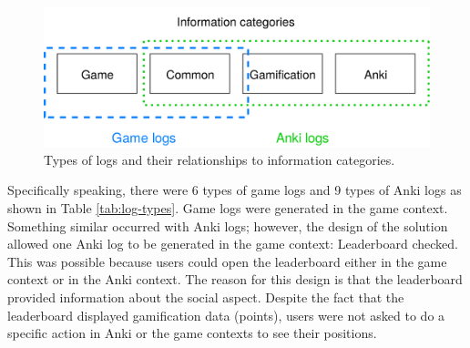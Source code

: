 \begin{figure}[htb]
    \vskip 5mm
        \begin{center}
            \includegraphics[scale=0.2]{./Figures/categories_logs.png}
            \caption{Types of logs and their relationships to information categories.}
            \label{fig:categories-logs}
        \end{center}
    \vskip -5mm
\end{figure}

Specifically speaking, there were 6 types of game logs and 9 types of Anki logs as shown in Table \ref{tab:log-types}. Game logs were generated in the game context. Something similar occurred with Anki logs; however, the design of the solution allowed one Anki log to be generated in the game context: Leaderboard checked. This was possible because users could open the leaderboard either in the game context or in the Anki context. The reason for this design is that the leaderboard provided information about the social aspect. Despite the fact that the leaderboard displayed gamification data (points), users were not asked to do a specific action in Anki or the game contexts to see their positions.

